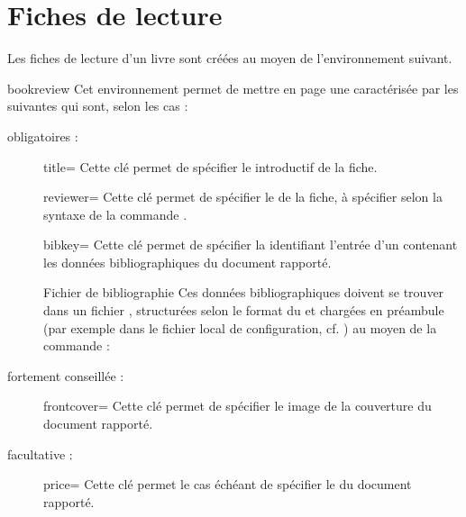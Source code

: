 \documentclass{letgut}
\begin{document}
\section{Fiches de lecture}
\label{sec:fiches-de-lecture}

Les fiches de lecture d'un livre sont créées au moyen de l'environnement
 suivant.

\begin{docEnvironment}[doclang/environment content=fiche de lecture]{bookreview}{}
  Cet environnement permet de mettre en page une 
  caractérisée par les  suivantes qui sont, selon les
  cas :
  \begin{description}
  \item[obligatoires :]
    \begin{docKey}{title}{=}{\valinitdef}
      Cette clé permet de spécifier le  introductif de la fiche.
    \end{docKey}
    \begin{docKey}{reviewer}{=}{\valinitdef}
      Cette clé permet de spécifier le  de la fiche, à spécifier
      selon la syntaxe de la commande .
    \end{docKey}
    \begin{docKey}{bibkey}{=}{\valinitdef}
      Cette clé permet de spécifier la  identifiant l'entrée d'un
       contenant les données bibliographiques du document rapporté.
      \begin{dbwarning}{Fichier de bibliographie}{}
        Ces données bibliographiques doivent se trouver dans un fichier
        , structurées selon le format du
         et chargées en préambule (par exemple dans le
        fichier local de configuration, cf. ) au
        moyen de la commande :
\begin{ltx-code}
\end{ltx-code}
      \end{dbwarning}
    \end{docKey}
  \item[fortement conseillée :]
    \begin{docKey}{frontcover}{=}{\valinitdef}
      Cette clé permet de spécifier le  image de la couverture du
      document rapporté.
    \end{docKey}
  \item[facultative :]
    \begin{docKey}{price}{=}{\valinitdef}
      Cette clé permet le cas échéant de spécifier le  du document rapporté.
    \end{docKey}
  \end{description}
\end{docEnvironment}
\end{document}
